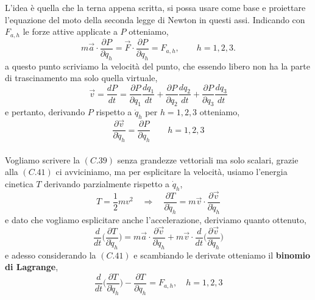 L'idea è quella che la terna appena scritta, si possa usare come base e proiettare l'equazione del moto della seconda legge di Newton in questi assi. Indicando con $F_{a,h}$ le forze attive applicate a $P$ otteniamo,
\begin{equation}
	m\vec{a} \cdot \frac{\partial P}{\partial q_h} = \vec{F} \cdot \frac{\partial P}{\partial q_h} = F_{a,h}, \qquad h = 1,2,3.
\end{equation}
a questo punto scriviamo la velocità del punto, che essendo libero non ha la parte di trascinamento ma solo quella virtuale,
\begin{equation}
	\vec{v} = \frac{dP}{dt} = \frac{\partial P}{\partial q_1} \frac{dq_1}{dt} + \frac{\partial P}{\partial q_2}\frac{dq_2}{dt} + \frac{\partial P}{\partial q_3}\frac{dq_3}{dt}
\end{equation}
e pertanto, derivando $P$ rispetto a $\dot{q}_h$ per $h = 1,2,3$ otteniamo,
\begin{equation}
	\frac{\partial \vec{v}}{\partial \dot{q}_h} = \frac{\partial P}{\partial q_h} \qquad h = 1,2,3
\end{equation}

\paragraph{} 
Vogliamo scrivere la $(C.39)$ senza grandezze vettoriali ma solo scalari, grazie alla $(C.41)$ ci avviciniamo, ma per esplicitare la velocità, usiamo l'energia cinetica $T$ derivando parzialmente rispetto a $\dot{q}_h$,
\begin{equation}
	T = \frac{1}{2}mv^2 \quad \Rightarrow \quad \frac{\partial T}{\partial \dot{q}_h} = m\vec{v} \cdot \frac{\partial \vec{v}}{\partial \dot{q}_h}
\end{equation}
e dato che vogliamo esplicitare anche l'accelerazione, deriviamo quanto ottenuto,
\begin{equation}
	\frac{d}{dt} \Biggl( \frac{\partial T}{\partial \dot{q}_h} \Biggr) = m \vec{a} \cdot \frac{\partial \vec{v}}{\partial \dot{q}_h} + m \vec{v} \cdot \frac{d}{dt} \Biggl( \frac{\partial \vec{v}}{\partial \dot{q}_h} \Biggr)
\end{equation}
e adesso considerando la $(C.41)$ e scambiando le derivate otteniamo il \textbf{binomio di Lagrange},
\begin{equation}
	\frac{d}{dt} \Biggl( \frac{\partial T}{\partial \dot{q}_h} \Biggr) - \frac{\partial T}{\partial q_h} = F_{a,h}, \quad h = 1,2,3
\end{equation}

